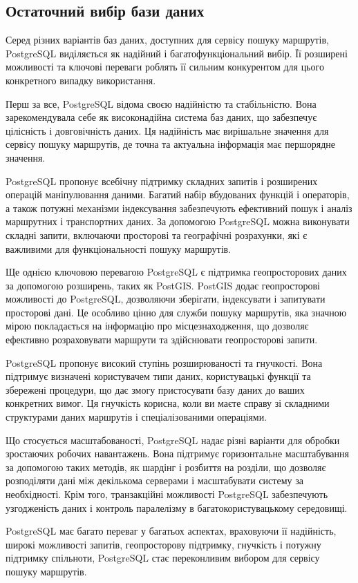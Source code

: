 \subsection{Остаточний вибір бази даних}
\label{subsec:final-choice-subsection}

Серед різних варіантів баз даних, доступних для сервісу пошуку маршрутів, PostgreSQL виділяється як надійний і багатофункціональний вибір. Її розширені можливості та ключові переваги роблять її сильним конкурентом для цього конкретного випадку використання.

Перш за все, PostgreSQL відома своєю надійністю та стабільністю. Вона зарекомендувала себе як високонадійна система баз даних, що забезпечує цілісність і довговічність даних. Ця надійність має вирішальне значення для сервісу пошуку маршрутів, де точна та актуальна інформація має першорядне значення.

PostgreSQL пропонує всебічну підтримку складних запитів і розширених операцій маніпулювання даними. Багатий набір вбудованих функцій і операторів, а також потужні механізми індексування забезпечують ефективний пошук і аналіз маршрутних і транспортних даних. За допомогою PostgreSQL можна виконувати складні запити, включаючи просторові та географічні розрахунки, які є важливими для функціональності пошуку маршрутів.

Ще однією ключовою перевагою PostgreSQL є підтримка геопросторових даних за допомогою розширень, таких як PostGIS. PostGIS додає геопросторові можливості до PostgreSQL, дозволяючи зберігати, індексувати і запитувати просторові дані. Це особливо цінно для служби пошуку маршрутів, яка значною мірою покладається на інформацію про місцезнаходження, що дозволяє ефективно розраховувати маршрути та здійснювати геопросторові запити.

PostgreSQL пропонує високий ступінь розширюваності та гнучкості. Вона підтримує визначені користувачем типи даних, користувацькі функції та збережені процедури, що дає змогу пристосувати базу даних до ваших конкретних вимог. Ця гнучкість корисна, коли ви маєте справу зі складними структурами даних маршрутів і спеціалізованими операціями.

Що стосується масштабованості, PostgreSQL надає різні варіанти для обробки зростаючих робочих навантажень. Вона підтримує горизонтальне масштабування за допомогою таких методів, як шардінг і розбиття на розділи, що дозволяє розподіляти дані між декількома серверами і масштабувати систему за необхідності. Крім того, транзакційні можливості PostgreSQL забезпечують узгодженість даних і контроль паралелізму в багатокористувацькому середовищі.

PostgreSQL має багато переваг у багатьох аспектах, враховуючи її надійність, широкі можливості запитів, геопросторову підтримку, гнучкість і потужну підтримку спільноти, PostgreSQL стає переконливим вибором для сервісу пошуку маршрутів.